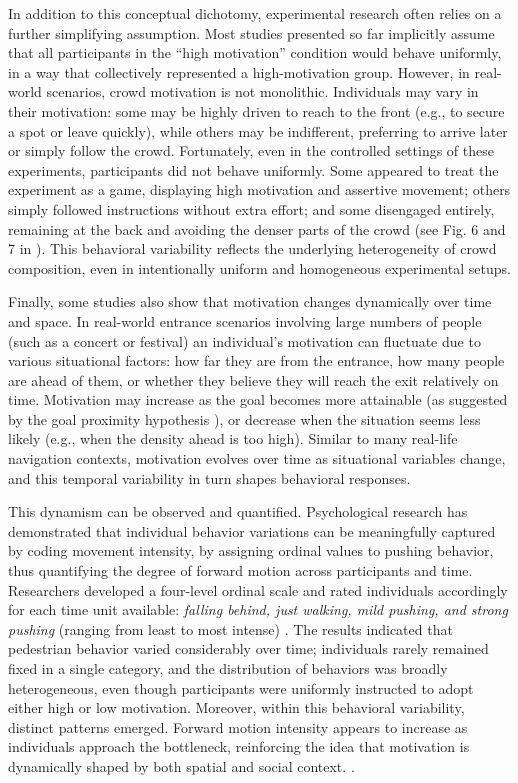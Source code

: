 \documentclass[pdflatex,sn-mathphys-num]{sn-jnl}%
\theoremstyle{thmstyleone}%
\theoremstyle{thmstyletwo}%
\theoremstyle{thmstylethree}%
\begin{document}
In addition to this conceptual dichotomy, experimental research often relies on a further simplifying assumption. Most studies presented so far implicitly assume that all participants in the “high motivation” condition would behave uniformly, in a way that collectively represented a high-motivation group. However, in real-world scenarios, crowd motivation is not monolithic. Individuals may vary in their motivation: some may be highly driven to reach to the front (e.g., to secure a spot or leave quickly), while others may be indifferent, preferring to arrive later or simply follow the crowd. Fortunately, even in the controlled settings of these experiments, participants did not behave uniformly. Some appeared to treat the experiment as a game, displaying high motivation and assertive movement; others simply followed instructions without extra effort; and some disengaged entirely, remaining at the back and avoiding the denser parts of the crowd (see Fig. 6 and 7 in \cite{adrian_crowds_2020}). This behavioral variability reflects the underlying heterogeneity of crowd composition, even in intentionally uniform and homogeneous experimental setups. 

Finally, some studies also show that motivation changes dynamically over time and space. In real-world entrance scenarios involving large numbers of people (such as a concert or festival) an individual’s motivation can fluctuate due to various situational factors: how far they are from the entrance, how many people are ahead of them, or whether they believe they will reach the exit  relatively on time. Motivation may increase as the goal becomes more attainable (as suggested by the goal proximity hypothesis \cite{jhang_impatience_2015}), or decrease when the situation seems less likely (e.g., when the density ahead is too high). Similar to many real-life navigation contexts, motivation evolves over time as situational variables change, and this temporal variability in turn shapes behavioral responses.

This dynamism can be observed and quantified. Psychological research has demonstrated that individual behavior variations can be meaningfully captured by coding movement intensity, by assigning ordinal values to pushing behavior, thus quantifying the degree of forward motion across participants and time. Researchers developed a four-level ordinal scale and rated individuals accordingly for each time unit available: \textit{falling behind, just walking, mild pushing, and strong pushing} (ranging from least to most intense) \cite{usten_pushing_2022}. The results indicated that pedestrian behavior varied considerably over time; individuals rarely remained fixed in a single category, and the distribution of behaviors was broadly heterogeneous, even though participants were uniformly instructed to adopt either high or low motivation. Moreover, within this behavioral variability, distinct patterns emerged. Forward motion intensity appears to increase as individuals approach the bottleneck, reinforcing the idea that motivation is dynamically shaped by both spatial and social context. \cite{usten_dynamic_2023}. 
\end{document}
